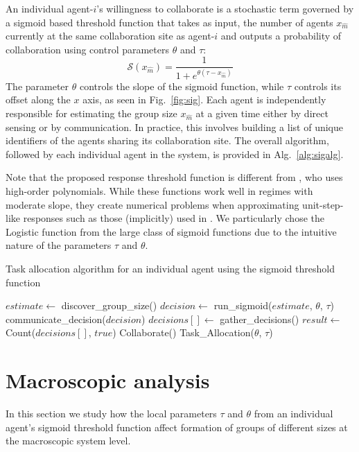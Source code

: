 \documentclass{svmult}  %
\newcommand{\sig}{\mathcal{S}}
\newcommand{\xm}{x_{\hat{m}}}
\begin{document}
An individual agent-$i$'s willingness to collaborate is a stochastic term governed by a sigmoid based threshold function that takes as input, the number of agents $\xm$ currently at the same collaboration site as agent-$i$ and outputs a probability of collaboration using control parameters $\theta$ and $\tau$:
\begin{equation}
	\sig(\xm) = \frac{1}{1+e^{\theta(\tau - \xm)}}\label{eq:sig}
\end{equation}
The parameter $\theta$ controls the slope of the sigmoid function, while $\tau$ controls its offset along the $x$ axis, as seen in Fig.~\ref{fig:sig}. Each agent is independently responsible for estimating the group size $\xm$ at a given time either by direct sensing or by communication. In practice,  this involves building a list of unique identifiers of the agents sharing its collaboration site. The overall algorithm, followed by each individual agent in the system, is provided in Alg.~\ref{alg:sigalg}.

Note that the proposed response threshold function is different from \cite{Bonabeau1999}, who uses high-order polynomials. While these functions work well in regimes with moderate slope, they create numerical problems when approximating unit-step-like responses such as those (implicitly) used in \cite{Lerman2001}. We particularly chose the Logistic function from the large class of sigmoid functions due to the intuitive nature of the parameters $\tau$ and $\theta$. 

\begin{algorithm}
\caption{Task allocation algorithm for an individual agent using the sigmoid threshold function}
\label{alg:sigalg}
\begin{algorithmic}
	\State $estimate \gets$ discover\_group\_size()
	\State $decision \gets$ run\_sigmoid($estimate$, $\theta$, $\tau$)
	\State communicate\_decision($decision$)
	\State $decisions[] \gets$ gather\_decisions()
	\State $result \gets$ Count($decisions[]$, $true$) 
		\State Collaborate()
		\State \Return
	\Else
		\State Task\_Allocation($\theta$, $\tau$)
	\EndIf
	\EndFunction
\end{algorithmic} 
\end{algorithm}



\section{Macroscopic analysis}\label{sec:macromodel}
In this section we study how the local parameters $\tau$ and $\theta$ from an individual agent's sigmoid threshold function affect formation of groups of different sizes at the macroscopic system level.
\end{document}
